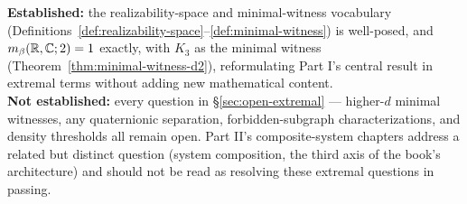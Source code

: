 \begin{ledgerentry}
\textbf{Established:} the realizability-space and minimal-witness vocabulary
(Definitions~\ref{def:realizability-space}--\ref{def:minimal-witness}) is
well-posed, and $m_\beta(\mathbb{R},\mathbb{C};2)=1$ exactly, with $K_3$ as the minimal
witness (Theorem~\ref{thm:minimal-witness-d2}), reformulating Part I's central
result in extremal terms without adding new mathematical content.\\
\textbf{Not established:} every question in \S\ref{sec:open-extremal} —
higher-$d$ minimal witnesses, any quaternionic separation, forbidden-subgraph
characterizations, and density thresholds all remain open. Part II's
composite-system chapters address a related but distinct question (system
composition, the third axis of the book's architecture) and should not be
read as resolving these extremal questions in passing.
\end{ledgerentry}
